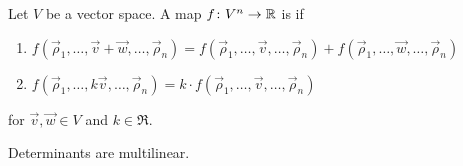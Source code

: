 \begin{definition} \label{def:multilinear}
Let \( V \) be a vector space.
A map \( \mbox{$f\colon V^n\to \mathbb{R}$} \) is
if  
\begin{enumerate}
  \item 
    $
      f(\vec{\rho}_1,\dots,\vec{v}+\vec{w},
      \ldots,\vec{\rho}_n)
      =f(\vec{\rho}_1,\dots,\vec{v},\dots,\vec{\rho}_n)
      +f(\vec{\rho}_1,\dots,\vec{w},\dots,\vec{\rho}_n)
    $
  \item 
    $
      f(\vec{\rho}_1,\dots,k\vec{v},\dots,\vec{\rho}_n)
      =k\cdot f(\vec{\rho}_1,\dots,\vec{v},\dots,\vec{\rho}_n)
    $
\end{enumerate}
for \( \vec{v}, \vec{w}\in V \) and \( k\in\Re \).
\end{definition}

\begin{lemma}  \label{lem:DetsMultilinear}
Determinants are multilinear.
\end{lemma}

